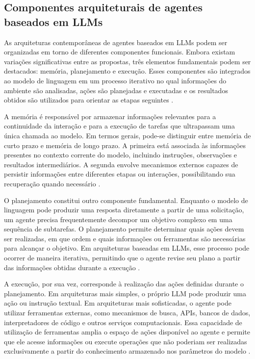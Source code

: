 \subsection{Componentes arquiteturais de agentes baseados em LLMs}

As arquiteturas contemporâneas de agentes baseados em LLMs podem ser organizadas em torno de diferentes componentes funcionais. Embora existam variações significativas entre as propostas, três elementos fundamentais podem ser destacados: memória, planejamento e execução. Esses componentes são integrados ao modelo de linguagem em um processo iterativo no qual informações do ambiente são analisadas, ações são planejadas e executadas e os resultados obtidos são utilizados para orientar as etapas seguintes \cite{cheng2026,zhao2026survey}.

A memória é responsável por armazenar informações relevantes para a continuidade da interação e para a execução de tarefas que ultrapassam uma única chamada ao modelo. Em termos gerais, pode-se distinguir entre memória de curto prazo e memória de longo prazo. A primeira está associada às informações presentes no contexto corrente do modelo, incluindo instruções, observações e resultados intermediários. A segunda envolve mecanismos externos capazes de persistir informações entre diferentes etapas ou interações, possibilitando sua recuperação quando necessário \cite{zhao2026survey}.

O planejamento constitui outro componente fundamental. Enquanto o modelo de linguagem pode produzir uma resposta diretamente a partir de uma solicitação, um agente precisa frequentemente decompor um objetivo complexo em uma sequência de subtarefas. O planejamento permite determinar quais ações devem ser realizadas, em que ordem e quais informações ou ferramentas são necessárias para alcançar o objetivo. Em arquiteturas baseadas em LLMs, esse processo pode ocorrer de maneira iterativa, permitindo que o agente revise seu plano a partir das informações obtidas durante a execução \cite{cheng2026,zhao2026survey}.

A execução, por sua vez, corresponde à realização das ações definidas durante o planejamento. Em arquiteturas mais simples, o próprio LLM pode produzir uma ação ou instrução textual. Em arquiteturas mais sofisticadas, o agente pode utilizar ferramentas externas, como mecanismos de busca, APIs, bancos de dados, interpretadores de código e outros serviços computacionais. Essa capacidade de utilização de ferramentas amplia o espaço de ações disponível ao agente e permite que ele acesse informações ou execute operações que não poderiam ser realizadas exclusivamente a partir do conhecimento armazenado nos parâmetros do modelo \cite{zhao2026survey}.

